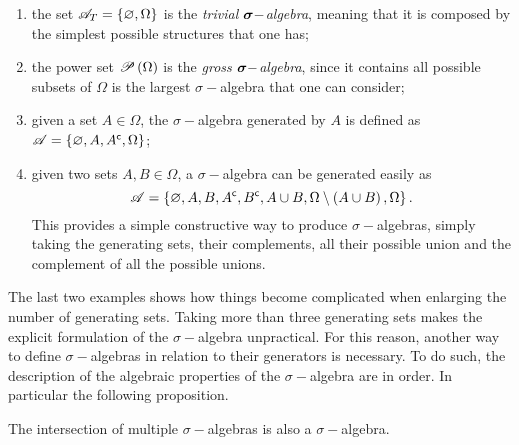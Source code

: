\begin{enumerate}[label=(\roman*)]
    \item the set $\mathscr{A}_{T}=\left\lbrace \varnothing,\Omega \right\rbrace$ is the \emph{trivial $\boldsymbol{\sigma}-$algebra}, meaning that it is composed by the simplest possible structures that one has;
    \item the power set $\mathscr{P}\left( \Omega \right)$ is the \emph{gross $\boldsymbol{\sigma}-$algebra}, since it contains all possible subsets of $\Omega$ is the largest $\sigma-$algebra that one can consider;
    \item given a set $A\in\Omega$, the $\sigma-$algebra generated by $A$ is defined as $\mathscr{A}=\left\lbrace \varnothing,A,{A}^{\mathsf{c}},\Omega \right\rbrace$;
    \item given two sets $A,B\in\Omega$, a $\sigma-$algebra can be generated easily as
    \begin{equation*}
        \mathscr{A}=\left\lbrace \varnothing,A,B,{A}^{\mathsf{c}},{B}^{\mathsf{c}},A\cup B,\Omega\setminus\left( A\cup B \right),\Omega \right\rbrace.    
    \end{equation*}
    This provides a simple constructive way to produce $\sigma-$algebras, simply taking the generating sets, their complements, all their possible union and the complement of all the possible unions. 
\end{enumerate}
The last two examples shows how things become complicated when enlarging the number of generating sets. Taking more than three generating sets makes the explicit formulation of the $\sigma-$algebra unpractical. For this reason, another way to define $\sigma-$algebras in relation to their generators is necessary. To do such, the description of the algebraic properties of the $\sigma-$algebra are in order. In particular the following proposition.
\begin{proposition}
    The intersection of multiple $\sigma-$algebras is also a $\sigma-$algebra.
\end{proposition}
